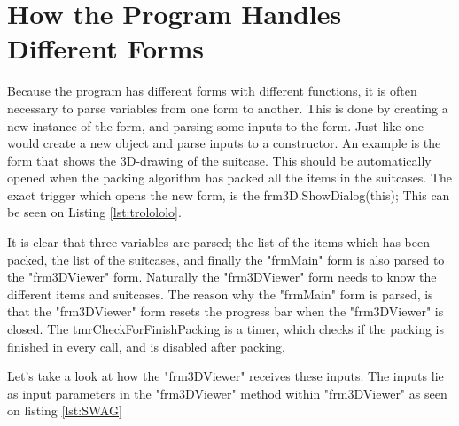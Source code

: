 \section{How the Program Handles Different Forms}

Because the program has different forms with different functions, it is often necessary to parse variables from one form to another. This is done by creating a new instance of the form, and parsing some inputs to the form. Just like one would create a new object and parse inputs to a constructor. An example is the form that shows the 3D-drawing of the suitcase. This should be automatically opened when the packing algorithm has packed all the items in the suitcases. The exact trigger which opens the new form, is the frm3D.ShowDialog(this); This can be seen on Listing \ref{lst:trolololo}. 


It is clear that three variables are parsed; the list of the items which has been packed, the list of the suitcases, and finally the "frmMain" form is also parsed to the "frm3DViewer" form. Naturally the "frm3DViewer" form needs to know the different items and suitcases. The reason why the "frmMain" form is parsed, is that the "frm3DViewer" form resets the progress bar when the "frm3DViewer" is closed. The tmrCheckForFinishPacking is a timer, which checks if the packing is finished in every call, and is disabled after packing.

Let's take a look at how the "frm3DViewer" receives these inputs. The inputs lie as input parameters in the "frm3DViewer" method within "frm3DViewer" as seen on listing \ref{lst:SWAG}

